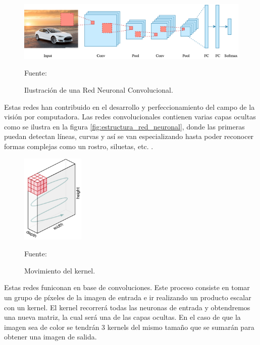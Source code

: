 \begin{figure}[H]
    \begin{center}
        \includegraphics[width=12cm]{img/capitulo_2/convolucional.png}
    \end{center}
    \begin{center}
        \caption{Ilustración de una Red Neuronal Convolucional.}
        Fuente: \cite{intro_redes_neuronales}
        \label{fig:red_neuronal_convolucional}
    \end{center}
\end{figure}

Estas redes han contribuido en el desarrollo y perfeccionamiento del campo de la visión por computadora. Las redes convolucionales contienen varias capas ocultas como se ilustra en la figura \ref{fig:estructura_red_neuronal}, donde las primeras puedan detectan líneas, curvas y así se van especializando hasta poder reconocer formas complejas como un rostro, siluetas, etc. \cite{convolutional:ia}. \\

\begin{figure}[H]
    \begin{center}
        \includegraphics[width=3cm]{img/capitulo_2/kernel.png}
    \end{center}
    \begin{center}
        \caption{Movimiento del kernel.}
        Fuente: \cite{comprension_redes_neuronales}
        \label{fig:kernel}
    \end{center}
\end{figure}

Estas redes funiconan en base de convoluciones. Este proceso consiste en tomar un grupo de píxeles de la imagen de entrada e ir realizando un producto escalar con un kernel. El kernel recorrerá todas las neuronas de entrada y obtendremos una nueva matriz, la cual será una de las capas ocultas. En el caso de que la imagen sea de color se tendrán 3 kernels del mismo tamaño que se sumarán para obtener una imagen de salida.\\

